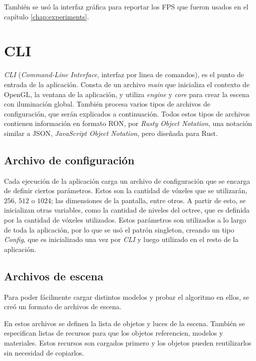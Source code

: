 También se usó la interfaz gráfica para reportar los FPS que fueron usados en el capítulo \ref{chap:experiments}.

\section{CLI}

\textit{CLI} (\textit{Command-Line Interface}, interfaz por linea de comandos), es el punto de entrada de la aplicación.
Consta de un archivo \textit{main} que inicializa el contexto de OpenGL, la ventana de la aplicación, y utiliza \textit{engine} y \textit{core} para crear la escena con iluminación global.
También procesa varios tipos de archivos de configuración, que serán explicados a continuación.
Todos estos tipos de archivos contienen información en formato RON, por \textit{Rusty Object Notation}, una notación similar a JSON, \textit{JavaScript Object Notation}, pero diseñada para Rust.

\subsection{Archivo de configuración}

Cada ejecución de la aplicación carga un archivo de configuración que se encarga de definir ciertos parámetros.
Estos son la cantidad de vóxeles que se utilizarán, $256$, $512$ o $1024$; las dimensiones de la pantalla, entre otros.
A partir de esto, se inicializan otras variables, como la cantidad de niveles del octree, que es definida por la cantidad de vóxeles utilizados.
Estos parámetros son utilizados a lo largo de toda la aplicación, por lo que se usó el patrón singleton, creando un tipo \textit{Config}, que es inicializado una vez por \textit{CLI} y luego utilizado en el resto de la aplicación.

\subsection{Archivos de escena}

Para poder fácilmente cargar distintos modelos y probar el algoritmo en ellos, se creó un formato de archivos de escena.

En estos archivos se definen la lista de objetos y luces de la escena.
También se especifican listas de recursos para que los objetos referencien, modelos y materiales.
Estos recursos son cargados primero y los objetos pueden reutilizarlos sin necesidad de copiarlos.


